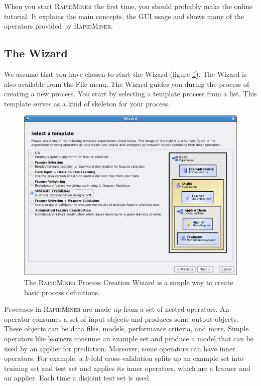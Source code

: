 \documentclass[11pt]{article}
\newcommand{\useroption}[1]{\textsf{#1}}
\newcommand{\rapidminer}{\protect \textsc{RapidMiner}\xspace}
\begin{document}
When you start \rapidminer the first time, you should probably make the online
tutorial. It explains the main concepts, the GUI usage and shows
many of the operators provided by \rapidminer.

\subsection{The Wizard}

We assume that you have chosen to start the Wizard (figure
\ref{fig:wizard_template}). The Wizard is also available from the
\useroption{File} menu. The Wizard guides you during the process of
creating a new process. You start by selecting a template
process from a list. This template serves as a kind of skeleton for
your process.
\begin{figure}[ht]
\center
\includegraphics[width=0.88\linewidth]{screenshot_template_valid.png}
\caption{The \rapidminer Process Creation Wizard is a simple way to create basic process definitions.}
\label{fig:wizard_template}
\end{figure}

Processes in \rapidminer are made up from a set of nested operators. An
operator consumes a set of input objects and produces some output
objects. These objects can be data files, models, performance criteria,
and more. Simple operators like learners consume an example set and
produce a model that can be used by an applier for
prediction. Moreover, some operators can have inner operators. For example, a
$k$-fold cross-validation splits up an example set into training set
and test set and applies its inner operators, which are a learner and
an applier. Each time a disjoint test set is used.
\end{document}
